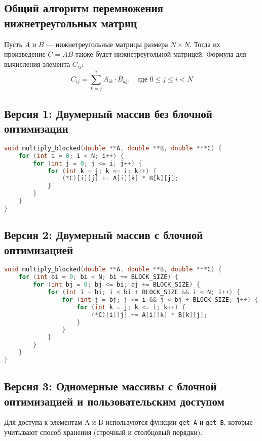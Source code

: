 \documentclass[14pt, russian]{matmex-diploma-custom}
\begin{document}
\subsection*{Общий алгоритм перемножения нижнетреугольных матриц}
Пусть $A$ и $B$ — нижнетреугольные матрицы размера $N \times N$. Тогда их произведение $C = AB$ также будет нижнетреугольной матрицей. Формула для вычисления элемента $C_{ij}$:
\begin{equation}
C_{ij} = \sum_{k=j}^{i} A_{ik} \cdot B_{kj}, \quad \text{где } 0 \leq j \leq i < N
\end{equation}

\subsection*{Версия 1: Двумерный массив без блочной оптимизации}
{\footnotesize
\begin{lstlisting}[language=C, caption={Алгоритм перемножения без блокировки для двумерных массивов}]
void multiply_blocked(double **A, double **B, double ***C) {
    for (int i = 0; i < N; i++) {
        for (int j = 0; j <= i; j++) {
            for (int k = j; k <= i; k++) {
                (*C)[i][j] += A[i][k] * B[k][j];
            }
        }
    }
}
\end{lstlisting}
}

\subsection*{Версия 2: Двумерный массив с блочной оптимизацией}
{\footnotesize
\begin{lstlisting}[language=C, caption={Алгоритм перемножения с блокировкой для двумерных массивов}]
void multiply_blocked(double **A, double **B, double ***C) {
    for (int bi = 0; bi < N; bi += BLOCK_SIZE) {
        for (int bj = 0; bj <= bi; bj += BLOCK_SIZE) {
            for (int i = bi; i < bi + BLOCK_SIZE && i < N; i++) {
                for (int j = bj; j <= i && j < bj + BLOCK_SIZE; j++) {
                    for (int k = j; k <= i; k++) {
                        (*C)[i][j] += A[i][k] * B[k][j];
                    }
                }
            }
        }
    }
}
\end{lstlisting}
}

\subsection*{Версия 3: Одномерные массивы с блочной оптимизацией и пользовательским доступом}
Для доступа к элементам A и B используются функции \texttt{get\_A} и \texttt{get\_B}, которые учитывают способ хранения (строчный и столбцовый порядки).
\end{document}
